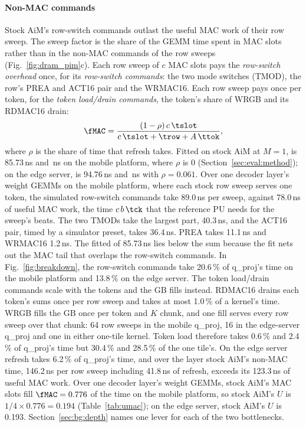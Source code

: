 \paragraph{Non-MAC commands}
Stock AiM's row-switch commands outlast the useful MAC work of their row sweep. The sweep factor \fMAC is the share of
the GEMM time spent in MAC slots rather than in the non-MAC commands of the row sweeps (Fig.~\ref{fig:dram_pim}c).
Each row sweep of $c$ MAC slots pays the \emph{row-switch overhead} \trow once, for its \emph{row-switch commands}: the
two mode switches (TMOD), the row's PREA and ACT16 pair and the WRMAC16. Each row sweep pays \ttok once per token, for the \emph{token load/drain
commands}, the token's share of WRGB and its RDMAC16 drain:
\begin{equation}
  \fMAC = \frac{(1 - \rho)\, c\, \tslot}{c\, \tslot + \trow + A\, \ttok},
\end{equation}
where $\rho$ is the share of time that refresh takes. Fitted on stock AiM at $M = 1$, \trow is 85.73\,ns and \,ns on the mobile platform, where $\rho$ is 0 (Section~\ref{sec:eval:method}); on the edge server, \trow is
94.76\,ns and \,ns with $\rho = 0.061$. Over one decoder layer's weight GEMMs on the mobile platform, where
each stock row sweep serves one token, the simulated row-switch commands take 89.0\,ns per sweep, against 78.0\,ns of
useful MAC work, the time $c\,b\,\tck$ that the reference PU needs for the sweep's beats. The two TMODs take the
largest part, 40.3\,ns, and the ACT16 pair, timed by a simulator preset, takes 36.4\,ns. PREA takes 11.1\,ns and
WRMAC16 1.2\,ns. The fitted \trow of 85.73\,ns lies below the sum because the fit nets out the MAC tail that overlaps
the row-switch commands. In Fig.~\ref{fig:breakdown}, the row-switch commands take 20.6\,\% of q\_proj's time on the
mobile platform and 13.8\,\% on the edge server. The token load/drain commands scale with the tokens and the GB fills
instead. RDMAC16 drains each token's sums once per row sweep and takes at most 1.0\,\% of a kernel's time. WRGB fills
the GB once per token and $K$ chunk, and one fill serves every row sweep over that chunk: 64 row sweeps in the mobile
q\_proj, 16 in the edge-server q\_proj and one in either one-tile kernel. Token load therefore takes 0.6\,\% and
2.4\,\% of q\_proj's time but 30.4\,\% and 28.5\,\% of the one tile's. On the edge server refresh takes 6.2\,\% of
q\_proj's time, and over the layer stock AiM's non-MAC time, 146.2\,ns per row sweep including 41.8\,ns of refresh,
exceeds its 123.3\,ns of useful MAC work. Over one decoder layer's weight GEMMs, stock AiM's MAC slots fill
$\fMAC = 0.776$ of the time on the mobile platform, so stock AiM's $U$ is $1/4 \times 0.776 = 0.194$
(Table~\ref{tab:umac}); on the edge server, stock AiM's $U$ is 0.193. Section~\ref{sec:bg:depth} names one lever for
each of the two bottlenecks.

